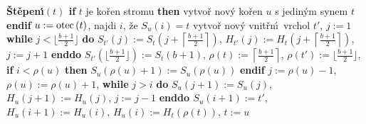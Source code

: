 {\bf \v St\v epen\'\i$\left(t\right)$\newline 
if} $t$ je ko\v ren stromu {\bf then}\newline 
\phantom{---}vytvo\v r nov\'y ko\v ren $u$ s jedin\'ym synem $t$\newline 
{\bf endif}\newline 
$u:=\operatorname{otec}\left(t\right)$, najdi $i$, \v ze $S_u\left(i\right)=t$\newline 
vytvo\v r nov\'y vnit\v rn\'\i\ vrchol $t'$, $j:=1$\newline 
{\bf while} $j<\lfloor\frac {b+1}2\rfloor$ {\bf do}\newline 
\phantom{---}$S_{t'}\left(j\right):=S_t\left(j+\left\lceil\frac {b+1}2\right\rceil \right)$, $H_{t'}\left(j\right):=H_t\left(j+\left\lceil\frac {b+1}2\right\rceil\right)$, $j:=j+1$\newline 
{\bf enddo}\newline 
$S_{t'}\left(\lfloor\frac {b+1}2\rfloor \right):=S_t\left(b+1\right)$, $\rho \left(t\right):=\left\lceil\frac {
b+1}2\right\rceil$, $\rho \left(t'\right):=\lfloor\frac {b+1}2\rfloor$,\newline 
{\bf if} $i<\rho \left(u\right)$ {\bf then} $S_u\left(\rho \left(u\right)+1\right):=S_u\left(\rho \left(u\right)\right)$ {\bf endif\newline}
$j:=\rho \left(u\right)-1$, $\rho \left(u\right):=\rho \left(u\right)+1$,\newline 
{\bf while} $j>i$ {\bf do}\newline 
\phantom{---}$S_u\left(j+1\right):=S_u\left(j\right)$, $H_u\left(j+1\right):=H_u\left(j\right)$, $j:=j-1$\newline 
{\bf enddo\newline 
$S_u\left(i+1\right):=t'$}, $H_u\left(i+1\right):=H_u\left(i\right)$, $H_u\left(i\right):=H_t\left(\rho \left(t\right)\right)$, 
$t:=u$
\medskip

